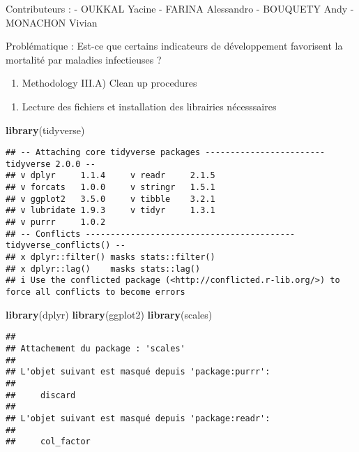 \documentclass[
]{article}
\author{}
\date{\vspace{-2.5em}}
\newenvironment{Shaded}{\begin{snugshade}}{\end{snugshade}}
\newcommand{\FunctionTok}[1]{\textcolor[rgb]{0.13,0.29,0.53}{\textbf{#1}}}
\newcommand{\NormalTok}[1]{#1}
\providecommand{\tightlist}{%
  \setlength{\itemsep}{0pt}\setlength{\parskip}{0pt}}
\begin{document}
Contributeurs : - OUKKAL Yacine - FARINA Alessandro - BOUQUETY Andy -
MONACHON Vivian

Problématique : Est-ce que certains indicateurs de développement
favorisent la mortalité par maladies infectieuses ?

\begin{enumerate}
\def\labelenumi{\Roman{enumi})}
\setcounter{enumi}{2}
\tightlist
\item
  Methodology III.A) Clean up procedures
\end{enumerate}

\begin{enumerate}
\def\labelenumi{\alph{enumi})}
\tightlist
\item
  Lecture des fichiers et installation des librairies nécesssaires
\end{enumerate}

\begin{Shaded}
\begin{Highlighting}[]
\FunctionTok{library}\NormalTok{(tidyverse)}
\end{Highlighting}
\end{Shaded}

\begin{verbatim}
## -- Attaching core tidyverse packages ------------------------ tidyverse 2.0.0 --
## v dplyr     1.1.4     v readr     2.1.5
## v forcats   1.0.0     v stringr   1.5.1
## v ggplot2   3.5.0     v tibble    3.2.1
## v lubridate 1.9.3     v tidyr     1.3.1
## v purrr     1.0.2     
## -- Conflicts ------------------------------------------ tidyverse_conflicts() --
## x dplyr::filter() masks stats::filter()
## x dplyr::lag()    masks stats::lag()
## i Use the conflicted package (<http://conflicted.r-lib.org/>) to force all conflicts to become errors
\end{verbatim}

\begin{Shaded}
\begin{Highlighting}[]
\FunctionTok{library}\NormalTok{(dplyr)}
\FunctionTok{library}\NormalTok{(ggplot2)}
\FunctionTok{library}\NormalTok{(scales)}
\end{Highlighting}
\end{Shaded}

\begin{verbatim}
## 
## Attachement du package : 'scales'
## 
## L'objet suivant est masqué depuis 'package:purrr':
## 
##     discard
## 
## L'objet suivant est masqué depuis 'package:readr':
## 
##     col_factor
\end{verbatim}
\end{document}
